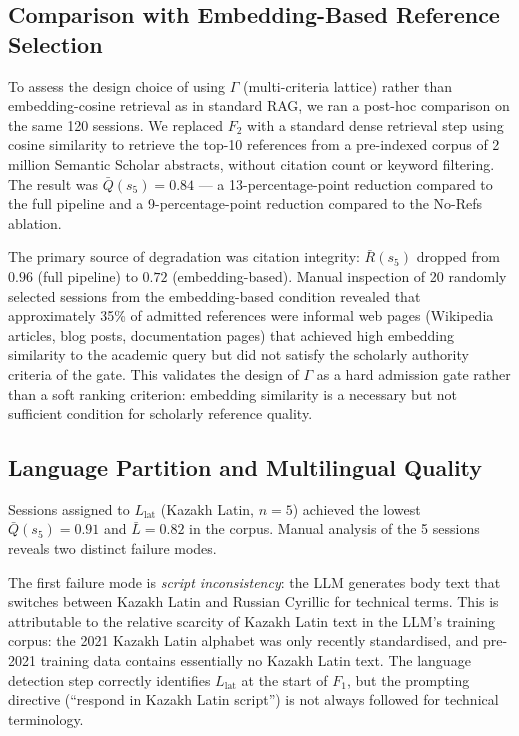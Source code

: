 \subsection{Comparison with Embedding-Based Reference Selection}

To assess the design choice of using $\Gamma$ (multi-criteria lattice) rather than
embedding-cosine retrieval as in standard RAG, we ran a post-hoc comparison on the
same 120 sessions.
We replaced $F_2$ with a standard dense retrieval step using cosine similarity to
retrieve the top-10 references from a pre-indexed corpus of 2 million Semantic Scholar
abstracts, without citation count or keyword filtering.
The result was $\bar{Q}(s_5)=0.84$ — a 13-percentage-point reduction compared to the
full pipeline and a 9-percentage-point reduction compared to the No-Refs ablation.

The primary source of degradation was citation integrity: $\bar{R}(s_5)$ dropped
from $0.96$ (full pipeline) to $0.72$ (embedding-based).
Manual inspection of 20 randomly selected sessions from the embedding-based condition
revealed that approximately 35\% of admitted references were informal web pages
(Wikipedia articles, blog posts, documentation pages) that achieved high embedding
similarity to the academic query but did not satisfy the scholarly authority criteria
of the \cgrag{} gate.
This validates the design of $\Gamma$ as a hard admission gate rather than a soft
ranking criterion: embedding similarity is a necessary but not sufficient condition
for scholarly reference quality.

\subsection{Language Partition and Multilingual Quality}

Sessions assigned to $L_{\mathrm{lat}}$ (Kazakh Latin, $n=5$) achieved the lowest
$\bar{Q}(s_5)=0.91$ and $\bar{L}=0.82$ in the corpus.
Manual analysis of the 5 sessions reveals two distinct failure modes.

The first failure mode is \emph{script inconsistency}: the LLM generates body text
that switches between Kazakh Latin and Russian Cyrillic for technical terms.
This is attributable to the relative scarcity of Kazakh Latin text in the LLM's
training corpus: the 2021 Kazakh Latin alphabet was only recently standardised,
and pre-2021 training data contains essentially no Kazakh Latin text.
The language detection step correctly identifies $L_{\mathrm{lat}}$ at the start of
$F_1$, but the prompting directive (``respond in Kazakh Latin script'') is not
always followed for technical terminology.

